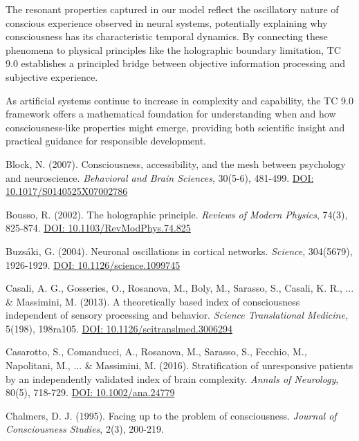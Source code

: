 \documentclass[12pt]{article}
\begin{document}
The resonant properties captured in our model reflect the oscillatory nature of conscious experience observed in neural systems, potentially explaining why consciousness has its characteristic temporal dynamics. By connecting these phenomena to physical principles like the holographic boundary limitation, TC 9.0 establishes a principled bridge between objective information processing and subjective experience.

As artificial systems continue to increase in complexity and capability, the TC 9.0 framework offers a mathematical foundation for understanding when and how consciousness-like properties might emerge, providing both scientific insight and practical guidance for responsible development.

\begin{thebibliography}{99}
     Block, N. (2007). Consciousness, accessibility, and the mesh between psychology and neuroscience. \emph{Behavioral and Brain Sciences}, 30(5-6), 481-499. \href{https://doi.org/10.1017/S0140525X07002786}{DOI: 10.1017/S0140525X07002786}
    
     Bousso, R. (2002). The holographic principle. \emph{Reviews of Modern Physics}, 74(3), 825-874. \href{https://doi.org/10.1103/RevModPhys.74.825}{DOI: 10.1103/RevModPhys.74.825}
    
     Buzsáki, G. (2004). Neuronal oscillations in cortical networks. \emph{Science}, 304(5679), 1926-1929. \href{https://doi.org/10.1126/science.1099745}{DOI: 10.1126/science.1099745}
    
     Casali, A. G., Gosseries, O., Rosanova, M., Boly, M., Sarasso, S., Casali, K. R., ... & Massimini, M. (2013). A theoretically based index of consciousness independent of sensory processing and behavior. \emph{Science Translational Medicine}, 5(198), 198ra105. \href{https://doi.org/10.1126/scitranslmed.3006294}{DOI: 10.1126/scitranslmed.3006294}
    
     Casarotto, S., Comanducci, A., Rosanova, M., Sarasso, S., Fecchio, M., Napolitani, M., ... & Massimini, M. (2016). Stratification of unresponsive patients by an independently validated index of brain complexity. \emph{Annals of Neurology}, 80(5), 718-729. \href{https://doi.org/10.1002/ana.24779}{DOI: 10.1002/ana.24779}
    
     Chalmers, D. J. (1995). Facing up to the problem of consciousness. \emph{Journal of Consciousness Studies}, 2(3), 200-219.
    

\end{thebibliography}
\end{document}
